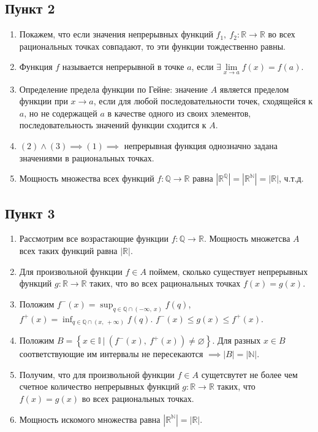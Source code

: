 \documentclass{article}
\begin{document}
\subsection*{Пункт 2}
\begin{enumerate}
    \item Покажем, что если значения непрерывных функций \(f_1,\ f_2: \mathbb{R} \to \mathbb{R}\) во всех рациональных точках совпадают, то эти функции тождественно равны.
    \item Функция \(f\) называется непрерывной в точке \(a\), если \(\exists \lim\limits_{x \to a} f(x) = f(a)\).
    \item Определение предела функции по Гейне: значение \(A\) является пределом функции при \(x \to a\), если для любой последовательности точек, сходящейся к \(a\), но не содержащей \(a\) в качестве одного из своих элементов, последовательность значений функции сходится к \(A\).
    \item \((2) \land (3) \implies (1) \implies \) непрерывная функция однозначно задана значениями в рациональных точках.
    \item Мощность множества всех функций \(f: \mathbb{Q} \to \mathbb{R}\) равна \(\left\vert \mathbb{R}^{\mathbb{Q}} \right\vert = \left\vert \mathbb{R}^{\mathbb{N}} \right\vert = \left\vert \mathbb{R} \right\vert\), ч.т.д.  
\end{enumerate}

\subsection*{Пункт 3}
\begin{enumerate}
    \item Рассмотрим все возрастающие функции \(f: \mathbb{Q} \to \mathbb{R}\). Мощность множетсва \(A\) всех таких функций равна \(\left\vert \mathbb{R} \right\vert\).
    \item Для произвольной функции \(f \in A\) поймем, сколько существует непрерывных функций \(g: \mathbb{R} \to \mathbb{R}\) таких, что во всех рациональных точках \(f(x) = g(x)\).
    \item Положим \(\displaystyle f^-(x) = \sup_{q \in \mathbb{Q} \cap {(-\infty,\ x)}} f(q)\), \(\displaystyle f^+(x) = \inf_{q \in \mathbb{Q} \cap {(x,\ +\infty)}} f(q)\). \(f^-(x) \leq g(x) \leq f^+(x)\).
    \item Положим \(B = \left\{x \in \mathbb{I}\ |\ (f^-(x),\ f^+(x)) \neq \varnothing \right\}\). Для разных \(x \in B\) соответствующие им интервалы не пересекаются \(\implies \left\vert B \right\vert = \left\vert \mathbb{N} \right\vert\).     
    \item Получим, что для произвольной функции \(f \in A\) сущетсвутет не более чем счетное количество непрерывных функций \(g: \mathbb{R} \to \mathbb{R}\) таких, что \(f(x) = g(x)\) во всех рациональных точках.
    \item Мощность искомого множества равна \(\left\vert \mathbb{R}^{\mathbb{N}} \right\vert = \left\vert \mathbb{R} \right\vert\).
\end{enumerate}
\end{document}
